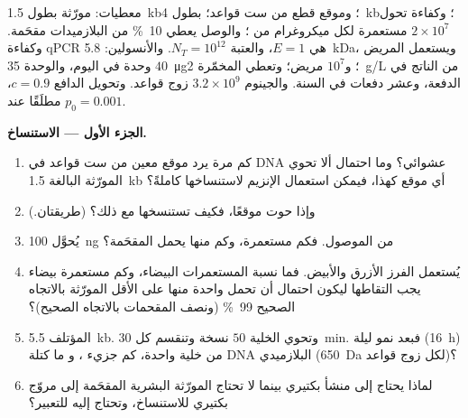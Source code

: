 \begin{problem}
\label{pb:b3:genetic-engineering:1}
معطيات: مورّثة بطول \qty{1.5}{kb}؛ وموقع قطع من ست قواعد؛ 
بطول \qty{4}{kb}؛ وكفاءة تحول $2\times 10^{7}$ مستعمرة لكل
ميكروغرام من ؛ والوصل يعطي \qty{10}{\%} من البلازميدات
مقحَمة. وكفاءة qPCR هي $E = 1$، والعتبة $N_{T} = 10^{12}$. والأنسولين:
\qty{5.8}{kDa}، ويستعمل المريض $40$ وحدة في اليوم، والوحدة
\qty{35}{\micro g}؛ و$10^{7}$ مريض؛ وتعطي المخمّرة
\qty{2}{g/L} من الناتج في الدفعة، وعشر دفعات في السنة. والجينوم $3.2\times
10^{9}$ زوج قواعد. وتحويل الدافع $c = 0.9$، مطلَقًا عند $p_{0} = 0.001$.

\medskip
\noindent\textbf{الجزء الأول --- الاستنساخ.}
\begin{enumerate}
  \item كم مرة يرد موقع معين من ست قواعد في DNA عشوائي؟ وما
        احتمال ألا تحوي المورّثة البالغة \qty{1.5}{kb} أي موقع
        كهذا، فيمكن استعمال الإنزيم لاستنساخها كاملةً؟
  \item وإذا حوت موقعًا، فكيف تستنسخها مع ذلك؟
        (طريقتان.)
  \item يُحوَّل \qty{100}{ng} من  الموصول. فكم
        مستعمرة، وكم منها يحمل المقحَمة؟
  \item يُستعمل الفرز الأزرق والأبيض. فما نسبة المستعمرات
        البيضاء، وكم مستعمرة بيضاء يجب التقاطها ليكون احتمال أن
        تحمل واحدة منها على الأقل المورّثة بالاتجاه
        الصحيح \qty{99}{\%} (ونصف المقحمات بالاتجاه الصحيح)؟
  \item {} المؤتلف \qty{5.5}{kb}. وتحوي الخلية $50$
        نسخة وتنقسم كل \qty{30}{min}. فبعد نمو ليلة
        (\qty{16}{h}) من خلية واحدة، كم جزيء ، و
        ما كتلة DNA البلازميدي (\qty{650}{Da} لكل زوج قواعد)؟
  \item لماذا يحتاج  إلى منشأ بكتيري بينما لا تحتاج
        المورّثة البشرية المقحَمة إلى مروّج بكتيري للاستنساخ،
        وتحتاج إليه للتعبير؟
\end{enumerate}


\end{problem}
